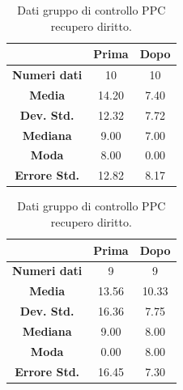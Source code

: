 \begin{table}
\begin{minipage}{0.48\textwidth}
 \label{tab:ompdiff} 
\end{minipage}
\hfill
\begin{minipage}{0.48\textwidth}
\centering

\begin{tabular}{|c|c|c|} \hline
{\textbf{}} & {\textbf{  \hspace{8pt}Prima\hspace{8pt} }} & {\textbf{ \hspace{8pt}Dopo\hspace{8pt}  }}\\ \hline
\textbf{Numeri dati} & 10 & 10 \\
\textbf{Media} & 14.20 & 7.40 \\  
\textbf{Dev. Std.} & 12.32 & 7.72 \\ 
\textbf{Mediana} & 9.00 & 7.00 \\ 
\textbf{Moda} & 8.00 & 0.00 \\ 
\textbf{Errore Std.}& 12.82 & 8.17 \\ 
\hline
\end{tabular}
\caption{Dati gruppo sperimentale PPC recupero diritto.}

\label{tab:accuracy} 
\end{minipage}%
\hfill
\begin{minipage}{0.48\textwidth}
\centering

\begin{tabular}{|c|c|c|} \hline
{\textbf{}} & {\textbf{  \hspace{8pt}Prima\hspace{8pt} }} & {\textbf{ \hspace{8pt}Dopo\hspace{8pt}  }}\\ \hline
\textbf{Numeri dati} & 9 & 9 \\ 
\textbf{Media} & 13.56 & 10.33 \\  
\textbf{Dev. Std.} & 16.36 & 7.75 \\  
\textbf{Mediana} & 9.00 & 8.00 \\ 
\textbf{Moda} & 0.00 & 8.00 \\ 
\textbf{Errore Std.} & 16.45 & 7.30\\ 
\hline
\end{tabular}
\caption{Dati gruppo di controllo PPC recupero diritto.}

 \label{tab:ompdiff} 
\end{minipage}
\end{table}

